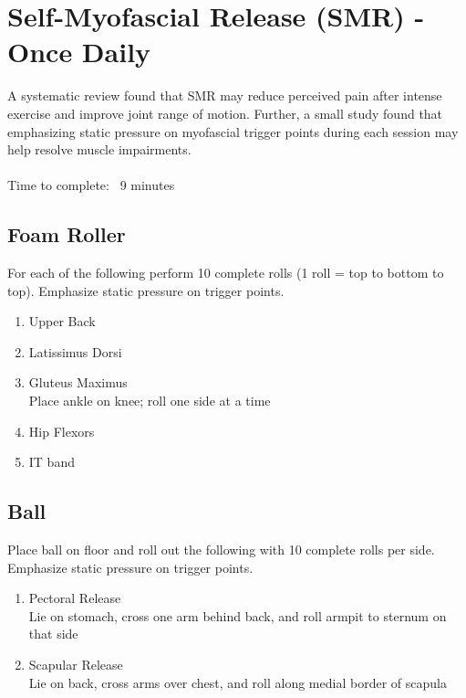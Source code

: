 \documentclass[12pt, letterpaper]{article}
\begin{document}
\newpage %


\section{Self-Myofascial Release (SMR) - Once Daily}

A systematic review found that SMR may reduce perceived pain after 
intense exercise and improve joint range of motion.\cite{pmid26618062} Further, a small study found that
 emphasizing static pressure on myofascial trigger points during each session may help resolve muscle impairments.\cite{pmid30765920} 
 \\
 \\
Time to complete: ~9 minutes

\subsection{Foam Roller}

For each of the following perform 10 complete rolls (1 roll = top to bottom to top). Emphasize static pressure on trigger points.
\begin{enumerate}
    \item Upper Back
    \item Latissimus Dorsi
    \item Gluteus Maximus \\ Place ankle on knee; roll one side at a time
    \item Hip Flexors
    \item IT band
\end{enumerate}

\subsection{Ball}
Place ball on floor and roll out the following with 10 complete rolls per side. Emphasize static pressure on trigger points.
\begin{enumerate}
    \item Pectoral Release \\ Lie on stomach, cross one arm behind back, and roll armpit to sternum on that side
    \item Scapular Release \\ Lie on back, cross arms over chest, and roll along medial border of scapula
\end{enumerate}
\end{document}
